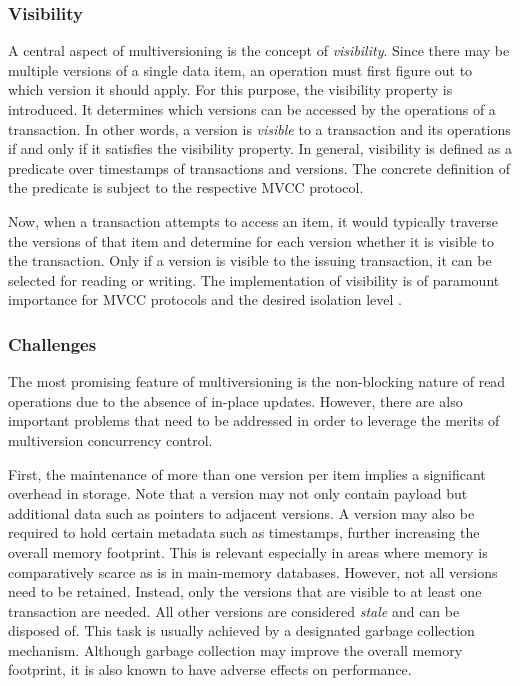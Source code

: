 \subsubsection{Visibility}

A central aspect of multiversioning is the concept of \emph{visibility}. Since
there may be multiple versions of a single data item, an operation must first
figure out to which version it should apply. For this purpose, the visibility
property is introduced. It determines which versions can be accessed by the
operations of a transaction. In other words, a version is \emph{visible} to a
transaction and its operations if and only if it satisfies the visibility
property. In general, visibility is defined as a predicate over timestamps of
transactions and versions. The concrete definition of the predicate is subject
to the respective MVCC protocol.

Now, when a transaction attempts to access an item, it would typically traverse
the versions of that item and determine for each version whether it is visible
to the transaction. Only if a version is visible to the issuing transaction, it
can be selected for reading or writing. The implementation of visibility is of
paramount importance for MVCC protocols and the desired isolation level
\cite{larson2011high}.

\subsubsection{Challenges}

The most promising feature of multiversioning is the non-blocking nature of read
operations due to the absence of in-place updates. However, there are also
important problems that need to be addressed in order to leverage the merits of
multiversion concurrency control.

First, the maintenance of more than one version per item implies a significant
overhead in storage. Note that a version may not only contain payload but
additional data such as pointers to adjacent versions. A version may also be
required to hold certain metadata such as timestamps, further increasing the
overall memory footprint. This is relevant especially in areas where memory is
comparatively scarce as is in main-memory databases. However, not all versions
need to be retained. Instead, only the versions that are visible to at least one
transaction are needed. All other versions are considered \emph{stale} and can
be disposed of. This task is usually achieved by a designated garbage collection
mechanism. Although garbage collection may improve the overall memory footprint,
it is also known to have adverse effects on performance.

